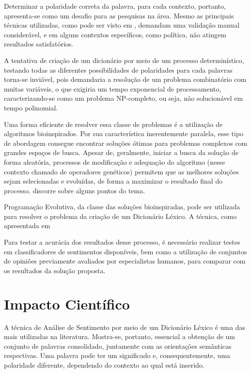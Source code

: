 \documentclass[a4paper,11pt]{article}
\begin{document}
Determinar a polaridade correta da palavra, para cada contexto, portanto, apresenta-se como um desafio para as pesquisas na área. Mesmo as principais técnicas utilizadas, como pode ser visto em \cite{taboada2011lexicon}, demandam uma validação manual considerável, e em alguns contextos específicos, como política, não atingem resultados satisfatórios.

A tentativa de criação de um dicionário por meio de um processo determinístico, testando todas as diferentes possibilidades de polaridades para cada palavras torna-se inviável, pois demandaria a resolução de um problema combinatório com muitas variáveis, o que exigiria um tempo exponencial de processamento, caracterizando-se como um problema NP-completo, ou seja, não solucionável em tempo polinomial.

Uma forma eficiente de resolver essa classe de problemas é a utilização de algoritmos bioinspirados. Por sua característica inerentemente paralela, esse tipo de abordagem consegue encontrar soluções ótimas para problemas complexos com grandes espaços de busca. Apesar de, geralmente, iniciar a busca da solução de forma aleatória, processos de modificação e adequação do algoritmo (nesse contexto chamado de operadores genéticos) permitem que as melhores soluções sejam selecionadas e evoluídas, de forma a maximizar o resultado final do processo. \cite{Abbasi} discorre sobre alguns pontos do tema.

Programação Evolutiva, da classe das soluções bioinspiradas, pode ser utilizada para resolver o problema da criação de um Dicionário Léxico. A técnica, como apresentada em \cite{Fogel2000}


Para testar a acurácia dos resultados desse processo, é necessário realizar testes em classificadores de sentimentos disponíveis, bem como a utilização de conjuntos de opiniões previamente avaliados por especialistas humanos, para comparar com os resultados da solução proposta.



\section{Impacto Científico}
\label{sec:impact}
A técnica de Análise de Sentimento por meio de um Dicionário Léxico é uma das mais utilizadas na literatura. Mostra-se, portanto, essencial a obtenção de um conjunto de palavras consolidado, juntamente com as orientações semânticas respectivas. 
Uma palavra pode ter um significado e, consequentemente, uma polaridade diferente, dependendo do contexto ao qual está inserido. 
\end{document}
